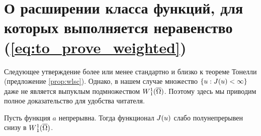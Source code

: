 \section{О расширении класса функций, для которых выполняется неравенство (\ref{eq:to_prove_weighted})}
\label{sec:wlsc}

Следующее утверждение более или менее стандартно и близко к теореме Тонелли (предложение \ref{prop:wlsc}).
Однако, в нашем случае множество $\{u: J(u) < \infty\}$ даже не является выпуклым подмножеством $\W(\overline{\Omega})$.
Поэтому здесь мы приводим полное доказательство для удобства читателя.

\begin{lm}
\label{lm:lowersemi}
Пусть функция $a$ непрерывна.
Тогда функционал $J(u)$ слабо полунепрерывен снизу в $\W(\overline{\Omega})$.
\end{lm}


